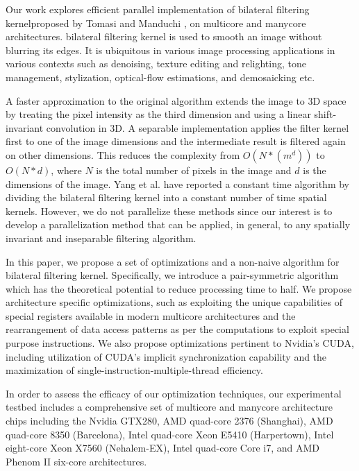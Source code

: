 \documentclass{IEEEtran}
\begin{document}
Our work explores efficient parallel implementation of bilateral filtering kernel\footnotemark[1] proposed by Tomasi and Manduchi \cite{Tomasi1998}, on multicore and manycore architectures. bilateral filtering kernel is used to smooth an image without blurring its edges. It is ubiquitous in various image processing applications in various contexts such as denoising\cite{zhang2008}, texture editing and relighting\cite{eisemann2004}, tone management\cite{Bae2006}, stylization\cite{DeCarlo2002}, optical-flow estimations\cite{Xiao2006}, and demosaicking\cite{Ramanath2003} etc. 

A faster approximation to the original algorithm \cite{Paris2009} extends the image to 3D space by treating the pixel intensity as the third dimension and using a linear shift-invariant convolution in 3D. A separable implementation \cite{Pham2005} applies the filter kernel first to one of the image dimensions and the intermediate result is filtered again on other dimensions. This reduces the complexity from $O(N*(m^{d}))$ to $O(N*d)$, where $N$ is the total number of pixels in the image and $d$ is the dimensions of the image. Yang et al.\cite{yang2009} have reported a constant time algorithm by dividing the bilateral filtering kernel into a constant number of time spatial kernels. However, we do not parallelize these methods since our interest is to develop a parallelization method that can be applied, in general, to any spatially invariant and inseparable filtering algorithm. 

In this paper, we propose a set of optimizations and a non-naive algorithm for bilateral filtering kernel. Specifically, we introduce a pair-symmetric algorithm which has the theoretical potential to reduce processing time to half. We propose architecture specific optimizations, such as exploiting the unique capabilities of special registers available in modern multicore architectures and the rearrangement of data access patterns as per the computations to exploit special purpose instructions. We also propose optimizations pertinent to Nvidia's CUDA, including utilization of CUDA's implicit synchronization capability and the maximization of single-instruction-multiple-thread efficiency. 

In order to assess the efficacy of our optimization techniques, our experimental testbed includes a comprehensive set of multicore and manycore architecture chips including the Nvidia GTX280, AMD quad-core 2376 (Shanghai), AMD quad-core 8350 (Barcelona), Intel quad-core Xeon E5410 (Harpertown), Intel eight-core Xeon X7560 (Nehalem-EX), Intel quad-core Core i7, and AMD Phenom II six-core architectures. 
\end{document}
